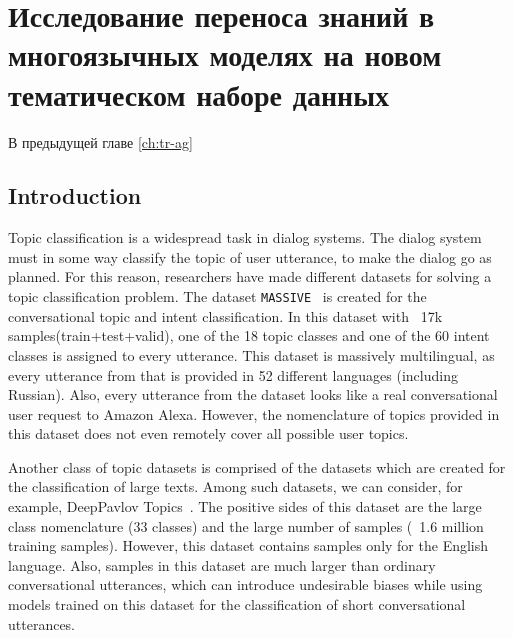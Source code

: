 \chapter{Исследование переноса знаний в многоязычных моделях на новом тематическом наборе данных}

В предыдущей главе \ref{ch:tr-ag} 

\section{Introduction}
Topic classification is a widespread task in dialog systems\cite{dream1_trudy}. The dialog system must in some way classify the topic of user utterance, to make the dialog go as planned. For this reason, researchers have made different datasets for solving a topic classification problem. 
The dataset \texttt{MASSIVE}~\cite{massive} is created for the conversational topic and intent classification. In this dataset with ~17k samples(train+test+valid), one of the 18 topic classes and one of the 60 intent classes is assigned to every utterance. This dataset is massively multilingual, as every utterance from that is provided in 52 different languages (including Russian). Also, every utterance from the dataset looks like a real conversational user request to Amazon Alexa. However, the nomenclature of topics provided in this dataset does not even remotely cover all possible user topics.

Another class of topic datasets is comprised of the datasets which are created for the classification of large texts. Among such datasets, we can consider, for example, DeepPavlov Topics~\cite{dp_topics}. The positive sides of this dataset are the large class nomenclature (33 classes) and the large number of samples (~1.6 million training samples). However, this dataset contains samples only for the English language. Also, samples in this dataset are much larger than ordinary conversational utterances, which can introduce undesirable biases while using models trained on this dataset for the classification of short conversational utterances.
\iffalse
For 4 class dp topics:
en & 5,731,625 & 0 & 74.6 & 75.6 & 94.2 & 91.4 & 93.6 & 86.4 & 79.3 & 78.1 & 82.1 & 76.9\\ \hline
en & 5,731,625 & 1 & 77.5 & 78.1 & 93.7 & 90.8 & 94.0 & 86.9 & 81.5 & 80.1 & 85.8 & 82.5\\ \hline

For 3 class dp topics:
en & 5,731,625 & 0 & 88.0 & 87.7 & 93.8 & 92.9 & 94.1 & 90.8 & 88.1 & 88.1\\ \hline
en & 5,731,625 & 1 & 88.4 & 87.8 & 93.9 & 93.0 & 93.9 & 90.1 & 89.0 & 89.0\\ \hline
\fi


